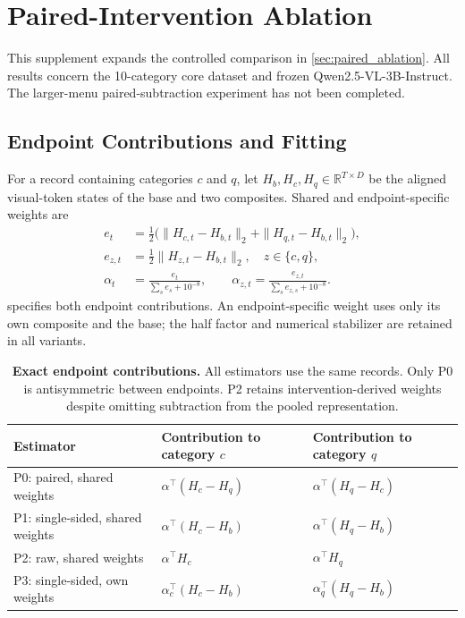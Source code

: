 \clearpage
\setcounter{page}{1}
\maketitlesupplementary

\section{Paired-Intervention Ablation}
\label{sec:supp_paired}

This supplement expands the controlled comparison in
\cref{sec:paired_ablation}. All results concern the 10-category core
dataset and frozen Qwen2.5-VL-3B-Instruct. The larger-menu
paired-subtraction experiment has not been completed.

\subsection{Endpoint Contributions and Fitting}

For a record containing categories \(c\) and \(q\), let
\(H_b,H_c,H_q\in\mathbb R^{T\times D}\) be the aligned visual-token
states of the base and two composites. Shared and endpoint-specific
weights are
\begin{equation}
    \begin{aligned}
        e_t&=\tfrac12\bigl(\|H_{c,t}-H_{b,t}\|_2
                         +\|H_{q,t}-H_{b,t}\|_2\bigr),\\
        e_{z,t}&=\tfrac12\|H_{z,t}-H_{b,t}\|_2,
        \quad z\in\{c,q\},\\
        \alpha_t&=\frac{e_t}{\sum_s e_s+10^{-8}},\qquad
        \alpha_{z,t}=\frac{e_{z,t}}{\sum_s e_{z,s}+10^{-8}}.
    \end{aligned}
\end{equation}
 specifies both endpoint contributions.
An endpoint-specific weight uses only its own composite and the base;
the half factor and numerical stabilizer are retained in all variants.

\begin{table}[t]
    \centering
    \small
    \begin{tabular}{lll}
        \toprule
        Estimator & Contribution to category \(c\) & Contribution to category \(q\) \\
        \midrule
        P0: paired, shared weights
            & \(\alpha^\top(H_c-H_q)\) & \(\alpha^\top(H_q-H_c)\) \\
        P1: single-sided, shared weights
            & \(\alpha^\top(H_c-H_b)\) & \(\alpha^\top(H_q-H_b)\) \\
        P2: raw, shared weights
            & \(\alpha^\top H_c\) & \(\alpha^\top H_q\) \\
        P3: single-sided, own weights
            & \(\alpha_c^\top(H_c-H_b)\) & \(\alpha_q^\top(H_q-H_b)\) \\
        \bottomrule
    \end{tabular}
    \caption{\textbf{Exact endpoint contributions.} All estimators use the
        same records. Only P0 is antisymmetric between endpoints. P2 retains
        intervention-derived weights despite omitting subtraction from
        the pooled representation.}
    \label{tab:paired_endpoints}
\end{table}

